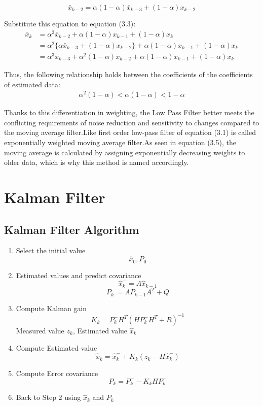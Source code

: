 \documentclass{article}
\numberwithin{equation}{section} %
\begin{document}
\begin{equation}
    \bar{x}_{k-2} = \alpha(1-\alpha)\bar{x}_{k-3} + (1-\alpha)x_{k-2}
\end{equation}

Substitute this equation to equation (3.3):
\begin{align}
    \bar{x}_k & = \alpha^{2}\bar{x}_{k-2} + \alpha(1-\alpha)x_{k-1}+ (1-\alpha)x_k \nonumber                                \\
              & = \alpha^{2}\{\alpha\bar{x}_{k-3} + (1-\alpha)x_{k-2}\} + \alpha(1-\alpha)x_{k-1} + (1-\alpha)x_k \nonumber \\
              & = \alpha^{3}x_{k-3} + \alpha^{2}(1-\alpha)x_{k-2} + \alpha(1-\alpha)x_{k-1} + (1-\alpha)x_k
\end{align}

Thus, the following relationship holds between the coefficients of the coefficients of estimated data:
\begin{align*}
    \alpha^{2}(1-\alpha) < \alpha(1-\alpha) < 1 - \alpha
\end{align*}

Thanks to this differentiation in weighting, the Low Pass Filter better meets the conflicting requirements of noise reduction and sensitivity to changes compared to the moving average filter.Like first order low-pass filter of equation (3.1) is called exponentially weighted moving average filter.As seen in equation (3.5), the moving average is calculated by assigning exponentially decreasing weights to older data, which is why this method is named accordingly.

\section{Kalman Filter}
\subsection{Kalman Filter Algorithm}
\begin{enumerate}
    \item Select the initial value
          \[\hat{x}_0, P_0\]
    \item  Estimated values and predict covariance
          \[\hat{x}^{-}_{k}=A\hat{x}_{k-1}\]
          \[P^{-}_{k}=AP_{k-1}A^{T} + Q\]
    \item Compute Kalman gain
          \[K_k = P^{-}_{k}H^{T}(HP^{-}_{k}H^{T} + R)^{-1}\]
          Measured value \(z_k\), Estimated value \(\hat{x}_k\)
    \item Compute Estimated value
          \[\hat{x}_k = \hat{x}^{-}_{k} + K_{k}(z_k-H\hat{x}^{-}_{k})\]
    \item Compute Error covariance
          \[P_k = P^{-}_{k} - K_kHP^{-}_{k}\]
    \item Back to Step 2 using \(\hat{x}_k\) and \(P_k\)
\end{enumerate}
\end{document}
